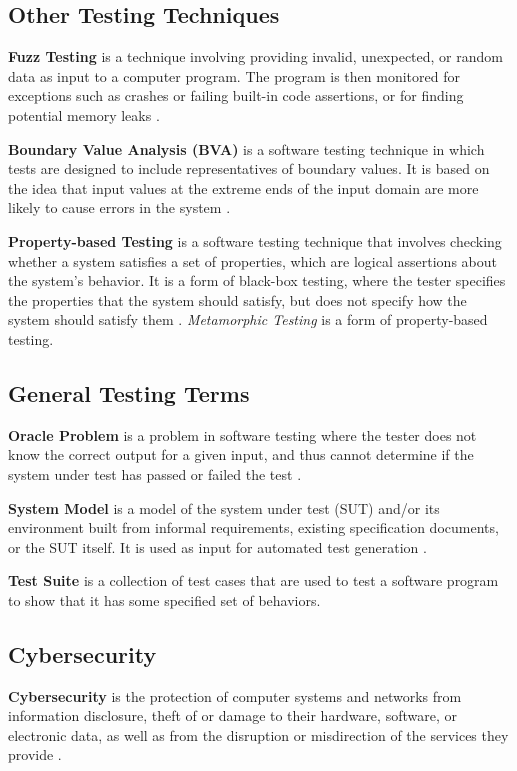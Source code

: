 \subsection{Other Testing Techniques}

\textbf{Fuzz Testing} is a technique involving providing invalid, unexpected, or random data as input to a computer program. The program is then monitored for exceptions such as crashes or failing built-in code assertions, or for finding potential memory leaks \cite{Fuzz}.

\textbf{Boundary Value Analysis (BVA)} is a software testing technique in which tests are designed to include representatives of boundary values. It is based on the idea that input values at the extreme ends of the input domain are more likely to cause errors in the system \cite{BVA}.

\textbf{Property-based Testing} is a software testing technique that involves checking whether a system satisfies a set of properties, which are logical assertions about the system's behavior. It is a form of black-box testing, where the tester specifies the properties that the system should satisfy, but does not specify how the system should satisfy them \cite{Hypothesis}. \textit{Metamorphic Testing} is a form of property-based testing.

\subsection{General Testing Terms}

\textbf{Oracle Problem} is a problem in software testing where the tester does not know the correct output for a given input, and thus cannot determine if the system under test has passed or failed the test \cite{FELDERER20161}.

\textbf{System Model} is a model of the system under test (SUT) and/or its environment built from informal requirements, existing specification documents, or the SUT itself. It is used as input for automated test generation \cite{FELDERER20161}.

\textbf{Test Suite} is a collection of test cases that are used to test a software program to show that it has some specified set of behaviors.

\subsection{Cybersecurity}

\textbf{Cybersecurity} is the protection of computer systems and networks from information disclosure, theft of or damage to their hardware, software, or electronic data, as well as from the disruption or misdirection of the services they provide \cite{FELDERER20161}.

